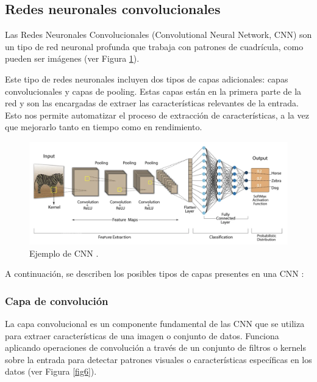 \subsection{Redes neuronales convolucionales}
Las Redes Neuronales Convolucionales (Convolutional Neural Network, CNN) \cite{35, 36, 37} son un tipo de red neuronal profunda que trabaja con patrones de cuadrícula, como pueden ser imágenes (ver Figura \ref{fig5}).

Este tipo de redes neuronales incluyen dos tipos de capas adicionales: capas convolucionales y capas de pooling. Estas capas están en la primera parte de la red y son las encargadas de extraer las características relevantes de la entrada. Esto nos permite automatizar el proceso de extracción de características, a la vez que mejorarlo tanto en tiempo como en rendimiento.

\begin{figure}[h]
	\centering
	\includegraphics[scale=0.55]{imagenes/cap2/cnn.png}
	\caption{Ejemplo de CNN \cite{41}.}
	\label{fig5}
\end{figure}

A continuación, se describen los posibles tipos de capas presentes en una CNN \cite{39,40}:


\subsubsection*{Capa de convolución}

La capa convolucional es un componente fundamental de las CNN que se utiliza para extraer características de una imagen o conjunto de datos. Funciona aplicando operaciones de convolución a través de un conjunto de filtros o kernels sobre la entrada para detectar patrones visuales o características específicas en los datos (ver Figura \ref{fig6}).

